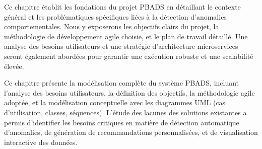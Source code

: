 \documentclass[
    12pt,
    a4paper,
    oneside
]{report}
\renewcommand{\headrulewidth}{0.4pt}
\renewcommand{\footrulewidth}{0pt}
\renewcommand{\headrulewidth}{0.4pt}
\renewcommand{\footrulewidth}{0pt}
\begin{document}
\fancypagestyle{plain}{
    \fancyhf{}
    \fancyhead[R]{\leftmark} %
    \renewcommand{\headrulewidth}{0.4pt}
    \fancyfoot[C]{\thepage}
    \renewcommand{\footrulewidth}{0pt}
}
\clearpage


\begin{flushright}
\begin{minipage}{0.6\textwidth}
Ce chapitre établit les fondations du projet PBADS en détaillant le contexte général et les problématiques spécifiques liées à la détection d'anomalies comportementales. Nous y exposerons les objectifs clairs du projet, la méthodologie de développement agile choisie, et le plan de travail détaillé. Une analyse des besoins utilisateurs et une stratégie d'architecture microservices seront également abordées pour garantir une exécution robuste et une scalabilité élevée.
\end{minipage}
\end{flushright}
\clearpage


\begin{flushright}
\begin{minipage}{0.6\textwidth}
Ce chapitre présente la modélisation complète du système PBADS, incluant l'analyse des besoins utilisateurs, la définition des objectifs, la méthodologie agile adoptée, et la modélisation conceptuelle avec les diagrammes UML (cas d'utilisation, classes, séquences). L'étude des lacunes des solutions existantes a permis d'identifier les besoins critiques en matière de détection automatique d'anomalies, de génération de recommandations personnalisées, et de visualisation interactive des données.
\end{minipage}
\end{flushright}
\clearpage

\end{document}
